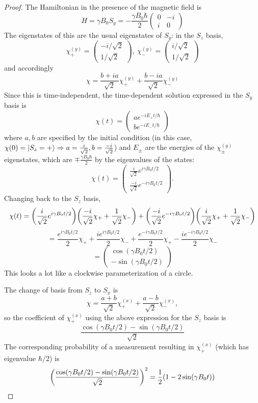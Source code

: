 \documentclass{article}
\begin{document}
\begin{proof}
  The Hamiltonian in the presence of the magnetic field is
  \[
    H = \gamma B_{0}S_{y} = -\frac{\gamma B_{0}\hbar}{2}
    \begin{pmatrix}
      0 & -i \\
      i & 0
    \end{pmatrix}
  \]
  The eigenstates of this are the usual eigenstates of $S_{y}$: in the $S_{z}$ basis,
  \[
    \chi_{+}^{(y)} =
    \begin{pmatrix}
      -i / \sqrt{2} \\
      1 / \sqrt{2}
    \end{pmatrix},\
    \chi_{-}^{(y)} =
    \begin{pmatrix}
      i / \sqrt{2} \\
      1 / \sqrt{2}
    \end{pmatrix}
  \]
  and accordingly
  \[
    \chi = \frac{b + ia}{\sqrt{2}}\chi_{+}^{(y)} + \frac{b - ia}{\sqrt{2}}\chi_{-}^{(y)}
  \]
  Since this is time-independent, the time-dependent solution expressed in the $S_{y}$ basis is
  \[
    \chi(t) =
    \begin{pmatrix}
      ae^{-iE_{+}t/\hbar} \\
      be^{-iE_{-}t/\hbar}
    \end{pmatrix}
  \]
  where $a, b$ are specified by the initial condition (in this case, $\chi(0) = \ket{S_{z} = +} \Rightarrow a = \frac{i}{\sqrt{2}},
  b = \frac{-i}{\sqrt{2}}$)
  and $E_{\pm}$ are the energies of the $\chi_{\pm}^{(y)}$ eigenstates, which are $\mp \frac{\gamma B_{0}\hbar}{2}$ by the eigenvalues of the states:
  \[
    \chi(t) =
    \begin{pmatrix}
      \frac{i}{\sqrt{2}}e^{i\gamma B_{0}t/2} \\
      \frac{-i}{\sqrt{2}}e^{-i\gamma B_{0}t/2}
    \end{pmatrix}.
  \]
  Changing back to the $S_{z}$ basis,
  \[
    \chi(t) = \qty(\frac{i}{\sqrt{2}}e^{i\gamma B_{0}t/2})\qty(\frac{-i}{\sqrt{2}}\chi_{+} + \frac{1}{\sqrt{2}}\chi_{-})
    + \qty(\frac{-i}{\sqrt{2}}e^{-i\gamma B_{0}t/2})\qty(\frac{i}{\sqrt{2}}\chi_{+} + \frac{1}{\sqrt{2}}\chi_{-})
  \]
  \[
    = \frac{e^{i\gamma B_{0}t/2}}{2}\chi_{+} + \frac{ie^{i\gamma B_{0}t/2}}{2}\chi_{-} + \frac{e^{-i\gamma B_{0}t/2}}{2}\chi_{+}
    - \frac{ie^{-i\gamma B_{0}t/2}}{2}\chi_{-}
  \]
  \[
    =
    \begin{pmatrix}
      \cos(\gamma B_{0}t/2) \\
      -\sin(\gamma B_{0}t/2)
    \end{pmatrix}
  \]
  This looks a lot like a clockwise parameterization of a circle.

  The change of basis from $S_{z}$ to $S_{x}$ is
  \[
    \chi = \frac{a + b}{\sqrt{2}}\chi_{+}^{(x)} + \frac{a - b}{\sqrt{2}}\chi_{-}^{(x)},
  \]
  so the coefficient of $\chi_{+}^{(x)}$ using the above expression for the $S_{z}$ basis is
  \[
    \frac{\cos(\gamma B_{0}t / 2) - \sin(\gamma B_{0}t/2)}{\sqrt{2}}
  \]
  The corresponding probability of a measurement resulting in $\chi_{+}^{(x)}$ (which has eigenvalue $\hbar/2$) is
  \[
    \qty(\frac{\cos(\gamma B_{0}t / 2) - \sin(\gamma B_{0}t/2)}{\sqrt{2}})^{2} = \frac{1}{2}\qty(1 - 2\sin(\gamma B_{0}t))
  \]
\end{proof}
\end{document}
